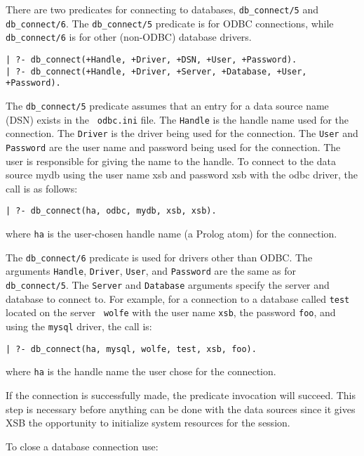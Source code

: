 There are two predicates for connecting to databases, {\tt db\_connect/5}
and {\tt db\_connect/6}.
The {\tt db\_connect/5} predicate is for ODBC connections, while {\tt
  db\_connect/6} is 
for other (non-ODBC) database drivers.

\begin{verbatim}
| ?- db_connect(+Handle, +Driver, +DSN, +User, +Password).
| ?- db_connect(+Handle, +Driver, +Server, +Database, +User, +Password).
\end{verbatim}

The {\tt db\_connect/5} predicate
assumes that an entry for a data source name (DSN) exists in the {\tt
  odbc.ini} file. The {\tt Handle} is the handle name used for the
connection. The {\tt Driver} is the driver being used for the connection.
The {\tt User} and {\tt Password} are the user name and password being used
for the connection. The user is responsible for giving the name to the
handle.  To connect to the data source mydb using the user name xsb and
password xsb with the odbc driver, the call is as follows:

\begin{verbatim}
| ?- db_connect(ha, odbc, mydb, xsb, xsb).
\end{verbatim}

\noindent
where {\tt ha} is the user-chosen handle name (a Prolog atom) for the
connection.

The {\tt db\_connect/6} predicate is used for drivers other than ODBC.  The
arguments {\tt Handle}, {\tt Driver}, {\tt User}, and {\tt Password} are
the same as for {\tt db\_connect/5}. The {\tt Server} and {\tt Database}
arguments specify the server and database to connect to.  For example, for
a connection to a database called {\tt test} located on the server {\tt
  wolfe} with the user name {\tt xsb}, the password {\tt foo}, and using
the {\tt mysql} driver, the call is:

\begin{verbatim}
| ?- db_connect(ha, mysql, wolfe, test, xsb, foo).
\end{verbatim}

\noindent
where {\tt ha} is the handle name the user chose for the connection.

If the connection is successfully made, the predicate invocation will
succeed.  This step is necessary before anything can be done with the
data sources since it gives XSB the opportunity to initialize system
resources for the session.

To close a database connection use:

